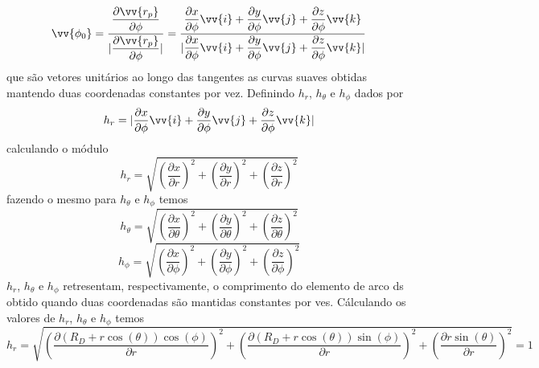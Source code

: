 \documentclass[12pt,oneside,a4paper]{abntex2}
\begin{document}
\begin{equation}
\vv{\phi_0} = \frac{\dfrac{\partial \vv{r_p}}{\partial \phi}}{ | \dfrac{\partial \vv{r_p}}{\partial \phi} |} = \frac{\dfrac{\partial x}{\partial \phi}\vv{i} + \dfrac{\partial y}{\partial \phi}\vv{j} + \dfrac{\partial z}{\partial \phi}\vv{k}}{ | \dfrac{\partial x}{\partial \phi}\vv{i} + \dfrac{\partial y}{\partial \phi}\vv{j} + \dfrac{\partial z}{\partial \phi}\vv{k} |}
\end{equation}
que são vetores unitários ao longo das tangentes as curvas suaves obtidas mantendo duas coordenadas constantes por vez.
Definindo $h_r$, $h_\theta$ e $h_\phi$ dados por 
\begin{equation}
h_r = | \dfrac{\partial x}{\partial \phi}\vv{i} + \dfrac{\partial y}{\partial \phi}\vv{j} + \dfrac{\partial z}{\partial \phi}\vv{k} |
\end{equation}
calculando o módulo
\begin{equation}
h_r = \sqrt{ \left(\dfrac{\partial x}{\partial r} \right)^2 + \left(\dfrac{\partial y}{\partial r}\right)^2 + \left(\dfrac{\partial z}{\partial r}\right)^2 }
\end{equation}
fazendo o mesmo para $h_\theta$ e $h_\phi$ temos
\begin{equation}
h_\theta = \sqrt{ \left(\dfrac{\partial x}{\partial \theta} \right)^2 + \left(\dfrac{\partial y}{\partial \theta}\right)^2 + \left(\dfrac{\partial z}{\partial \theta}\right)^2 }
\end{equation}
\begin{equation}
h_\phi = \sqrt{ \left(\dfrac{\partial x}{\partial \phi} \right)^2 + \left(\dfrac{\partial y}{\partial \phi}\right)^2 + \left(\dfrac{\partial z}{\partial \phi}\right)^2 }
\end{equation}
$h_r$, $h_\theta$ e $h_\phi$ retresentam, respectivamente, o comprimento do elemento de arco ds obtido quando duas coordenadas são mantidas constantes por ves.
Cálculando os valores de $h_r$, $h_\theta$ e $h_\phi$ temos
\begin{equation}
h_r = \sqrt{ \left(\dfrac{\partial (R_D+r \cos(\theta)) \cos(\phi)}{\partial r} \right)^2 + \left(\dfrac{\partial (R_D+r \cos(\theta)) \sin(\phi)}{\partial r}\right)^2 + \left(\dfrac{\partial r \sin(\theta)}{\partial r}\right)^2 } = 1
\end{equation}
\end{document}
